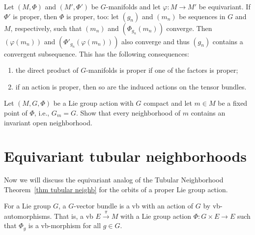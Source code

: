 \begin{rem}\label{rem 6.3.9 RS1}
    Let $(M,\Phi)$ and $(M',\Phi')$ be $G$-manifolds and let $\varphi:M\to M'$ be equivariant. If $\Phi'$ is proper, then $\Phi$ is proper, too: let $(g_n)$ and $(m_n)$ be sequences in $G$ and $M$, respectively, such that $(m_n)$ and $(\Phi_{g_n}(m_n))$ converge. Then $(\varphi(m_n))$ and $\left(\Phi'_{g_n}(\varphi(m_n))\right)$ also converge and thus $(g_n)$ contains a convergent subsequence. This has the following consequences:
    \begin{enumerate}
        \item the direct product of $G$-manifolds is proper if one of the factors is proper;
        \item if an action is proper, then so are the induced actions on the tensor bundles.
    \end{enumerate}
\end{rem}

\begin{xca}\label{xca 6.3.2 RS1}
    Let $(M,G,\Phi)$ be a Lie group action with $G$ compact and let $m\in M$ be a fixed point of $\Phi$, i.e., $G_m=G$. Show that every neighborhood of $m$ contains an invariant open neighborhood.
\end{xca}






\section{Equivariant tubular neighborhoods}

Now we will discuss the equivariant analog of the Tubular Neighborhood Theorem~\ref{thm tubular neighb} for the orbits of a proper Lie group action.

\begin{defn}
    For a Lie group $G$, a $G$-vector bundle is a \gls{vb} with an action of $G$ by \gls{vb}-automorphisms. That is, a \gls{vb} $E\overset{\pi}{\to}M$ with a Lie group action $\Phi:G\times E\to E$ such that $\Phi_g$ is a \gls{vb}-morphism for all $g\in G$.
\end{defn}

